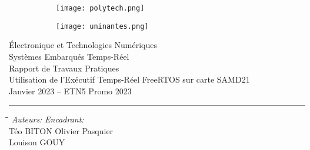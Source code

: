 
\begin{figure}[h]
	\centering
	\begin{subfigure}{0.3\textwidth}
		\texttt{[image: polytech.png]} 
	\end{subfigure}
	\begin{subfigure}{0.3\textwidth}
		\texttt{[image: uninantes.png]} 
	\end{subfigure}
\end{figure}

\begin{center}
	\vspace{1.5cm}
	\LARGE{Électronique et Technologies Numériques\\}
	\Large{Systèmes Embarqués Temps-Réel}\\
	\vspace{3cm}
	\Huge{Rapport de Travaux Pratiques}\\\vspace{2.25cm}
	\LARGE{Utilisation de l'Exécutif Temps-Réel FreeRTOS
	sur carte SAMD21}\\
	\vspace{4.5cm}
	{\normalsize Janvier 2023 -- ETN5 Promo 2023} \\
	\vspace{0.2cm}
	\hrule
\end{center}
\vspace*{\fill}
\begin{tabbing}
	\hspace{200pt}\=\hspace{200pt}\=\kill
	\large \textit{Auteurs:}\> \> \textit{Encadrant:}\\
	Téo BITON \> \> Olivier Pasquier \\
	Louison GOUY  \> \> \\
\end{tabbing}

\thispagestyle{empty}